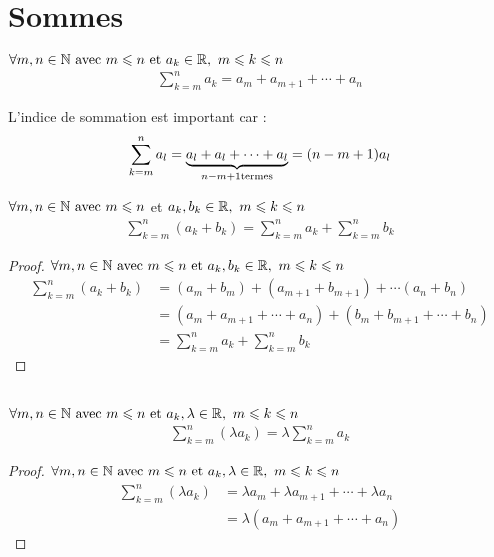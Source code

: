 \section{Sommes}
\begin{definition}
	$\forall m, n \in \mathbb{N} \textnormal{ avec } m \leqslant n \textnormal{ et } a_k \in \mathbb{R}, \ m \leqslant k \leqslant n$
	\begin{align*}
		\sum_{k = m}^{n}a_k = a_m + a_{m+1} + \cdots + a_n
	\end{align*}
\end{definition}

\begin{remarque}
	L'indice de sommation est important car :
	\begin{align*}
		\sum_{k = m}^{n}a_l = \underbrace{a_l + a_l + \cdots + a_l}_{n - m + 1 \textnormal{termes}} = (n - m + 1)a_l
	\end{align*}
\end{remarque}
\begin{proposition}
	$\forall m, n \in \mathbb{N} \textnormal{ avec } m \leqslant n$ et $a_k, b_k \in \mathbb{R}, \ m \leqslant k \leqslant n$
	\begin{align*}
		\sum_{k = m}^{n} (a_k + b_k) = \sum_{k=m}^{n}a_k + \sum_{k=m}^{n}b_k
	\end{align*}
\end{proposition}
\begin{proof}
	$\forall m, n \in \mathbb{N} \textnormal{ avec } m \leqslant n \textnormal{ et } a_k, b_k \in \mathbb{R}, \ m \leqslant k \leqslant n$
	\begin{align*}
		\sum_{k = m}^{n} (a_k + b_k) &= (a_m + b_m) + (a_{m+1} + b_{m+1}) + \cdots (a_n + b_n)\\
		&= (a_m + a_{m+1} + \cdots + a_n) + (b_m + b_{m+1} + \cdots + b_n) \\
		&= \sum_{k=m}^{n}a_k + \sum_{k=m}^{n}b_k
	\end{align*}
\end{proof}
\begin{proposition}~
	\\
	$\forall m, n \in \mathbb{N} \textnormal{ avec } m \leqslant n \textnormal{ et } a_k, \lambda \in \mathbb{R}, \ m \leqslant k \leqslant n$
	\begin{align*}
		\sum_{k = m}^{n} (\lambda a_k) = \lambda \sum_{k = m}^{n} a_k
	\end{align*}
\end{proposition}
\begin{proof}
	$\forall m, n \in \mathbb{N} \textnormal{ avec } m \leqslant n \textnormal{ et } a_k, \lambda \in \mathbb{R}, \ m \leqslant k \leqslant n$
	\begin{align*}
		\sum_{k = m}^{n} (\lambda a_k) &=  \lambda a_m + \lambda a_{m+1} + \cdots + \lambda a_n \\
		&= \lambda (a_m + a_{m+1} + \cdots + a_n)
	\end{align*}
\end{proof}

